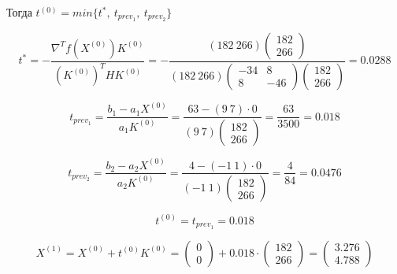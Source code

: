 Тогда $t^{(0)} = min\{t^*,\ t_{prev_1},\ t_{prev_2}\}$

\begin{equation*}
	t^* = -\frac{\nabla^T f(X^{(0)}) K^{(0)}}{(K^{(0)})^T H K^{(0)}} = -\frac{(182\ 266) \begin{pmatrix} 182 \\ 266 \end{pmatrix}}{(182\ 266) \begin{pmatrix} -34 & 8 \\ 8 & -46 \end{pmatrix} \begin{pmatrix} 182 \\ 266 \end{pmatrix}} = 0.0288
\end{equation*}

\begin{equation*}
	t_{prev_1} = \frac{b_1 - a_1 X^{(0)}}{a_1 K^{(0)}} = \frac{63 - (9\ 7) \cdot 0}{(9\ 7) \begin{pmatrix} 182 \\ 266 \end{pmatrix}} = \frac{63}{3500} = 0.018
\end{equation*}

\begin{equation*}
	t_{prev_2} = \frac{b_2 - a_2 X^{(0)}}{a_2 K^{(0)}} = \frac{4 - (-1\ 1) \cdot 0}{(-1\ 1) \begin{pmatrix} 182 \\ 266 \end{pmatrix}} = \frac{4}{84} = 0.0476
\end{equation*}

\begin{equation*}
	t^{(0)} = t_{prev_1} = 0.018
\end{equation*}

\begin{equation*}
	X^{(1)} = X^{(0)} + t^{(0)} K^{(0)} = \begin{pmatrix}
		0 \\ 0 
	\end{pmatrix}
	+
	0.018 \cdot \begin{pmatrix}
		182 \\ 266 
	\end{pmatrix}
	=
	\begin{pmatrix}
		3.276 \\ 4.788
	\end{pmatrix}
\end{equation*}

